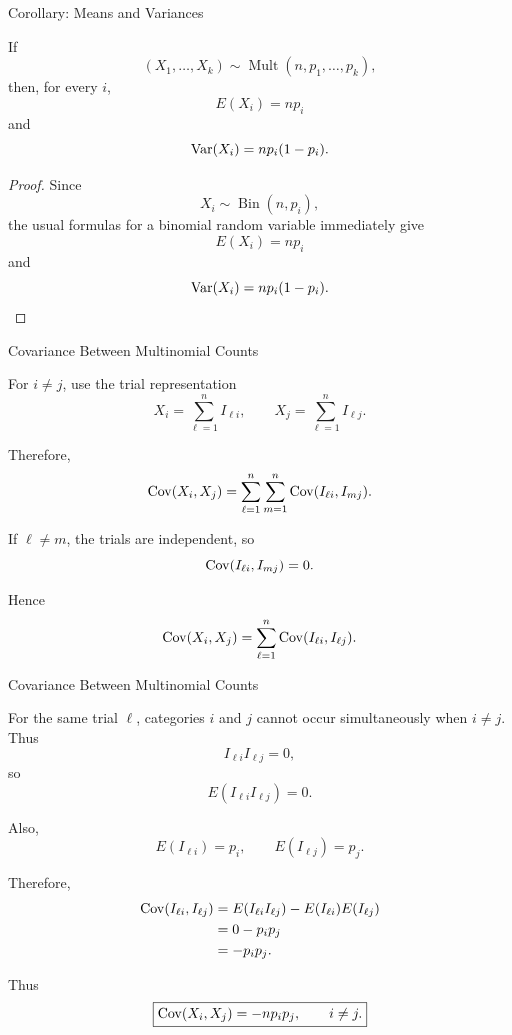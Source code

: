 \begin{frame}{Corollary: Means and Variances}

\begin{corollary}
If
\[
(X_1,\dots,X_k)
\sim
\operatorname{Mult}(n,p_1,\dots,p_k),
\]
then, for every $i$,
\[
E(X_i)=np_i
\]
and
\[
\operatorname{Var}(X_i)=np_i(1-p_i).
\]
\end{corollary}

\begin{proof}
Since
\[
X_i\sim\operatorname{Bin}(n,p_i),
\]
the usual formulas for a binomial random variable immediately give
\[
{E(X_i)=np_i}
\]
and
\[
{\operatorname{Var}(X_i)=np_i(1-p_i)}.
\]
\end{proof}

\end{frame}

\begin{frame}{Covariance Between Multinomial Counts}

For $i\neq j$, use the trial representation
\[
X_i=\sum_{\ell=1}^n I_{\ell i},
\qquad
X_j=\sum_{\ell=1}^n I_{\ell j}.
\]

Therefore,
\[
\operatorname{Cov}(X_i,X_j)
=
\sum_{\ell=1}^n\sum_{m=1}^n
\operatorname{Cov}(I_{\ell i},I_{mj}).
\]

If $\ell\neq m$, the trials are independent, so
\[
\operatorname{Cov}(I_{\ell i},I_{mj})=0.
\]

Hence
\[
\operatorname{Cov}(X_i,X_j)
=
\sum_{\ell=1}^n
\operatorname{Cov}(I_{\ell i},I_{\ell j}).
\]

\end{frame}

\begin{frame}{Covariance Between Multinomial Counts}

For the same trial $\ell$, categories $i$ and $j$ cannot occur
simultaneously when $i\neq j$. Thus
\[
I_{\ell i}I_{\ell j}=0,
\]
so
\[
E(I_{\ell i}I_{\ell j})=0.
\]

Also,
\[
E(I_{\ell i})=p_i,
\qquad
E(I_{\ell j})=p_j.
\]

Therefore,
\begin{align*}
\operatorname{Cov}(I_{\ell i},I_{\ell j})
&=
E(I_{\ell i}I_{\ell j})
-
E(I_{\ell i})E(I_{\ell j})\\
&=
0-p_ip_j\\
&=
-p_ip_j.
\end{align*}

Thus
\[
\boxed{
\operatorname{Cov}(X_i,X_j)
=
-np_ip_j,
\qquad i\neq j.
}
\]

\end{frame}

